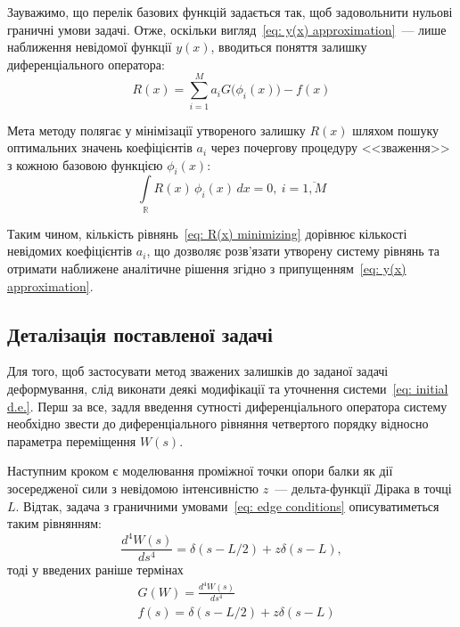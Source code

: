 \documentclass{mathreport}
\begin{document}
Зауважимо, що перелік базових функцій задається так, щоб задовольнити нульові граничні умови задачі. Отже, оскільки вигляд~\eqref{eq: y(x) approximation}~--- лише наближення невідомої функції $y(x)$, вводиться поняття залишку диференціального оператора:
\begin{equation}\label{eq: R(x) residual}
    R(x) = \sum\limits_{i=1}^{M} a_i G\bigl( \phi_i(x) \bigr) - f(x)
\end{equation}

Мета методу полягає у мінімізації утвореного залишку $R(x)$ шляхом пошуку оптимальних значень коефіцієнтів $a_i$ через почергову процедуру <<зваження>> з кожною базовою функцією $\phi_i(x)$:
\begin{equation}\label{eq: R(x) minimizing}
    \int\limits_{\mathbb{R}} R(x)\, \phi_i(x)\, dx = 0,\ i=\overline{1,M}
\end{equation}

Таким чином, кількість рівнянь~\eqref{eq: R(x) minimizing} дорівнює кількості невідомих коефіцієнтів $a_i$, що дозволяє розв'язати утворену систему рівнянь та отримати наближене аналітичне рішення згідно з припущенням~\eqref{eq: y(x) approximation}.

\subsection*{Деталізація поставленої задачі}

Для того, щоб застосувати метод зважених залишків до заданої задачі деформування, слід виконати деякі модифікації та уточнення системи~\eqref{eq: initial d.e.}. Перш за все, задля введення сутності диференціального оператора систему необхідно звести до диференціального рівняння четвертого порядку відносно параметра переміщення $W(s)$. 

Наступним кроком є моделювання проміжної точки опори балки як дії зосередженої сили з невідомою інтенсивністю $z$~--- дельта-функції Дірака в точці $L$. Відтак, задача з граничними умовами~\eqref{eq: edge conditions} описуватиметься таким рівнянням:
\begin{equation}\label{eq: united initial d.e.}
    \frac{d^4W(s)}{ds^4} = \delta(s-L/2) + z\delta(s-L),
\end{equation}
тоді у введених раніше термінах
\begin{align}\label{eq: G(W)}
    & G(W) = \frac{d^4W(s)}{ds^4} \\
    & f(s) = \delta(s-L/2) + z\delta(s-L)
\end{align}
\end{document}
